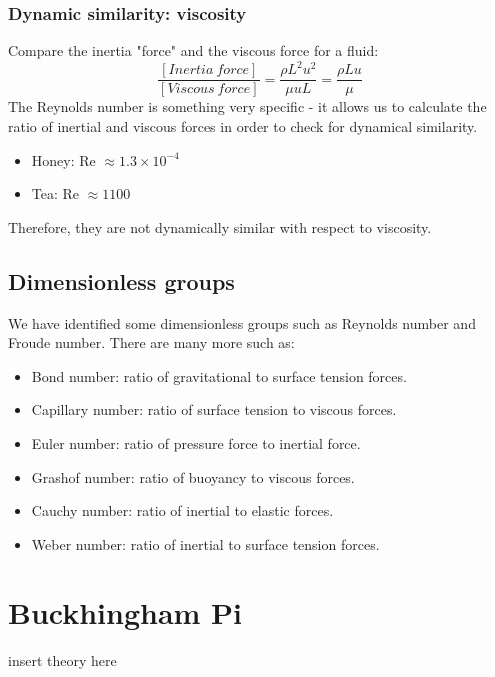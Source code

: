 \documentclass[class=report, crop=false, 12pt,a4paper]{standalone}
\begin{document}
\subsubsection{Dynamic similarity: viscosity}
Compare the inertia "force" and the viscous force for a fluid:
\[ \frac{[Inertia \ force]}{[Viscous \ force]} = \frac{\rho L^2 u^2}{\mu u L} = \frac{\rho L u }{\mu} \]
The Reynolds number is something very specific - it allows us to calculate the ratio of inertial and viscous forces in order to check for dynamical similarity.
\begin{itemize}[noitemsep]
  \item Honey: Re \(\approx 1.3 \times 10^{-4}\)
  \item Tea: Re \(\approx 1100 \)
\end{itemize}
Therefore, they are not dynamically similar with respect to viscosity.
\subsection{Dimensionless groups}
We have identified some dimensionless groups such as Reynolds number and Froude number. There are many more such as:
\begin{itemize}[noitemsep]
  \item Bond number: ratio of gravitational to surface tension forces.
  \item Capillary number: ratio of surface tension to viscous forces.
  \item Euler number: ratio of pressure force to inertial force.
  \item Grashof number: ratio of buoyancy to viscous forces.
  \item Cauchy number: ratio of inertial to elastic forces.
  \item Weber number: ratio of inertial to surface tension forces.
\end{itemize}
\section{Buckhingham Pi}
insert theory here
\end{document}
